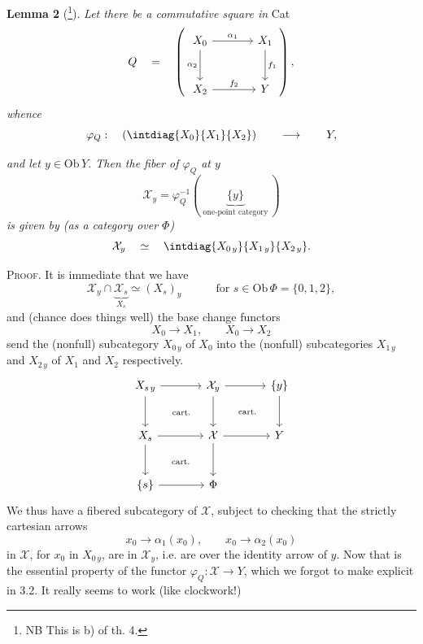 \noindent\textbf{Lemma 2} (\footnote[106]{NB This is b) of th. 4.}). \textit{Let there be a commutative square in} Cat
\[
Q \quad = \quad
\left(
\begin{tikzcd}[row sep=large,column sep=large]
X_0 \arrow[r, "\alpha_1"] \arrow[d, "\alpha_2"'] & X_1 \arrow[d, "f_1"] \\
X_2 \arrow[r, "f_2"] & Y
\end{tikzcd}
\right),
\]
\textit{whence}
\[
\varphi_Q : \quad \left( \intdiag{X_0}{X_1}{X_2} \right) \qquad\longrightarrow\qquad Y,
\]

\textit{and let $y\in\mathrm{Ob}\,Y$. Then the fiber of $\varphi_Q$ at $y$}
\[
\mathcal{X}_y = \varphi_Q^{-1}(\ \underbrace{\{y\}}_{\text{one-point category}}\ )
\]
\textit{is given by (as a category over $\Phi$)}
\[
\mathcal{X}_y \quad\simeq\quad \intdiag{X_{0\,y}}{X_{1\,y}}{X_{2\,y}} .
\]

\noindent\textsc{Proof.} It is immediate that we have
\[
\mathcal{X}_y\cap\underbrace{\mathcal{X}_s}_{X_s}\simeq(X_s)_y \qquad\quad \text{for } s\in\mathrm{Ob}\,\Phi=\{0,1,2\},
\]
and (chance does things well) the base change functors
\[
X_0\longrightarrow X_1, \qquad X_0\longrightarrow X_2
\]
send the (nonfull) subcategory $X_{0\,y}$ of $X_0$ into the (nonfull) subcategories $X_{1\,y}$ and $X_{2\,y}$ of $X_1$ and $X_2$ respectively.
\[
\begin{tikzcd}[row sep=large,column sep=large]
X_{s\,y} \arrow[r] \arrow[d] \arrow[dr, phantom, "\scriptstyle\text{cart.}"] & \mathcal{X}_y \arrow[r] \arrow[d] \arrow[dr, phantom, "\scriptstyle\text{cart.}"] & \{y\} \arrow[d] \\
X_s \arrow[r] \arrow[d] \arrow[dr, phantom, "\scriptstyle\text{cart.}"] & \mathcal{X} \arrow[r] \arrow[d] & Y \\
\{s\} \arrow[r] & \Phi &
\end{tikzcd}
\]
We thus have a fibered subcategory of $\mathcal{X}$, subject to checking that the strictly cartesian arrows
\[
x_0\longrightarrow\alpha_1(x_0), \qquad x_0\longrightarrow\alpha_2(x_0)
\]
in $\mathcal{X}$, for $x_0$ in $X_{0\,y}$, are in $\mathcal{X}_y$, i.e. are over the identity arrow of $y$. Now that is the essential property
of the functor $\varphi_Q : \mathcal{X}\longrightarrow Y$, which we forgot to make explicit in 3.2. It really seems to work (like clockwork!)

